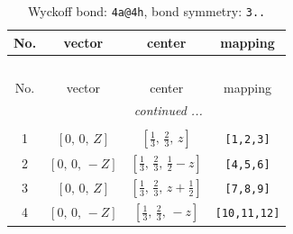 \documentclass[fleqn,8pt]{jsarticle}
\begin{document}
\renewcommand{\arraystretch}{1.2}
\begin{longtable}{cccc}
\caption{Wyckoff bond: {\tt 4a@4h}, bond symmetry: {\tt 3..}}
 \\
 \hline \hline
No. & vector & center & mapping \\ \hline \endfirsthead

\multicolumn{3}{l}{\tablename\ \thetable{}} \\
 \hline \hline
No. & vector & center & mapping \\ \hline \endhead

 \hline \hline
\multicolumn{3}{r}{\footnotesize\it continued ...} \\ \endfoot

 \hline \hline
\multicolumn{3}{r}{} \\ \endlastfoot

1 & $\left[ 0,\, 0,\, Z \right]$ & $\left[ \frac{1}{3},\, \frac{2}{3},\, z \right]$ & {\tt [1,2,3]} \\ \hline
2 & $\left[ 0,\, 0,\, - Z \right]$ & $\left[ \frac{1}{3},\, \frac{2}{3},\, \frac{1}{2} - z \right]$ & {\tt [4,5,6]} \\ \hline
3 & $\left[ 0,\, 0,\, Z \right]$ & $\left[ \frac{1}{3},\, \frac{2}{3},\, z + \frac{1}{2} \right]$ & {\tt [7,8,9]} \\ \hline
4 & $\left[ 0,\, 0,\, - Z \right]$ & $\left[ \frac{1}{3},\, \frac{2}{3},\, - z \right]$ & {\tt [10,11,12]} \\
\end{longtable}
\renewcommand{\arraystretch}{1.2}
\end{document}
